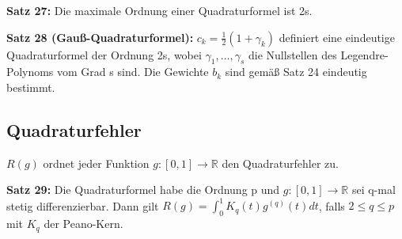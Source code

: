 \documentclass[a4paper]{article}
\begin{document}
\textbf{Satz 27:} Die maximale Ordnung einer Quadraturformel ist 2s.

\textbf{Satz 28 (Gauß-Quadraturformel):} $c_k = \frac{1}{2} (1 + \gamma_k)$
definiert eine eindeutige Quadraturformel der Ordnung 2s, wobei $\gamma_1,
\dots, \gamma_s$ die Nullstellen des Legendre-Polynoms vom Grad s sind. Die
Gewichte $b_k$ sind gemäß Satz 24 eindeutig bestimmt.

\subsection{Quadraturfehler}

$R(g)$ ordnet jeder Funktion $g: [0, 1] \to \mathbb{R}$ den Quadraturfehler zu.

\vspace{1em}

\textbf{Satz 29:} Die Quadraturformel habe die Ordnung p und $g : [0, 1] \to
\mathbb{R}$ sei q-mal stetig differenzierbar. Dann gilt $R(g) = \int_0^1 K_q(t)
g^{(q)} (t) dt$, falls $2 \le q \le p$ mit $K_q$ der Peano-Kern.
\end{document}
